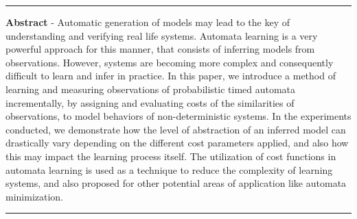\hrule
\vspace{12pt}
\noindent \textbf{Abstract} - 
Automatic generation of models may lead to the key of understanding and verifying real life systems. 
%
Automata learning is a very powerful approach for this manner, that consists of inferring models from observations. 
%
However, systems are becoming more complex and consequently difficult to learn and infer in practice. 
%
In this paper, we introduce a method of learning and measuring observations of probabilistic timed automata incrementally, by assigning and evaluating costs of the similarities of observations, to model behaviors of non-deterministic systems.
%
In the experiments conducted, we demonstrate how the level of abstraction of an inferred model can drastically vary depending on the different cost parameters applied, and also how this may impact the learning process itself.
%
The utilization of cost functions in automata learning is used as a technique to reduce the complexity of learning systems, and also proposed for other potential areas of application like automata minimization. 
%

 





\vspace{12pt}
\hrule
\clearpage


